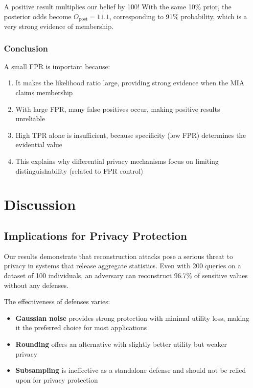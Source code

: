 \documentclass[11pt,letterpaper]{article}
\begin{document}
A positive result multiplies our belief by 100! With the same 10\% prior, the posterior odds become $O_{\text{post}} = 11.1$, corresponding to 91\% probability, which is a very strong evidence of membership.

\subsubsection{Conclusion}

A small FPR is important because:

\begin{enumerate}[leftmargin=*]
    \item It makes the likelihood ratio large, providing strong evidence when the MIA claims membership
    \item With large FPR, many false positives occur, making positive results unreliable
    \item High TPR alone is insufficient, because specificity (low FPR) determines the evidential value
    \item This explains why differential privacy mechanisms focus on limiting distinguishability (related to FPR control)
\end{enumerate}

\section{Discussion}

\subsection{Implications for Privacy Protection}

Our results demonstrate that reconstruction attacks pose a serious threat to privacy in systems that release aggregate statistics. Even with 200 queries on a dataset of 100 individuals, an adversary can reconstruct 96.7\% of sensitive values without any defenses.

The effectiveness of defenses varies:

\begin{itemize}[leftmargin=*]
    \item \textbf{Gaussian noise} provides strong protection with minimal utility loss, making it the preferred choice for most applications
    \item \textbf{Rounding} offers an alternative with slightly better utility but weaker privacy
    \item \textbf{Subsampling} is ineffective as a standalone defense and should not be relied upon for privacy protection
\end{itemize}
\end{document}
